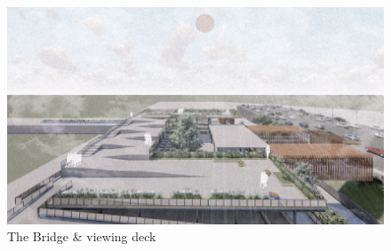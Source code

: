 ﻿%
\begin{figure}[H]
	\centering
	\includegraphics[width=\linewidth]{src/graphics/rawa-buntu-station-2-0--perspective-01.jpg}
	\caption*{
		The Bridge \& viewing deck
	}
	\label{
		fig:rawa-buntu-station-2-0--perspective-01
	}
\end{figure}
